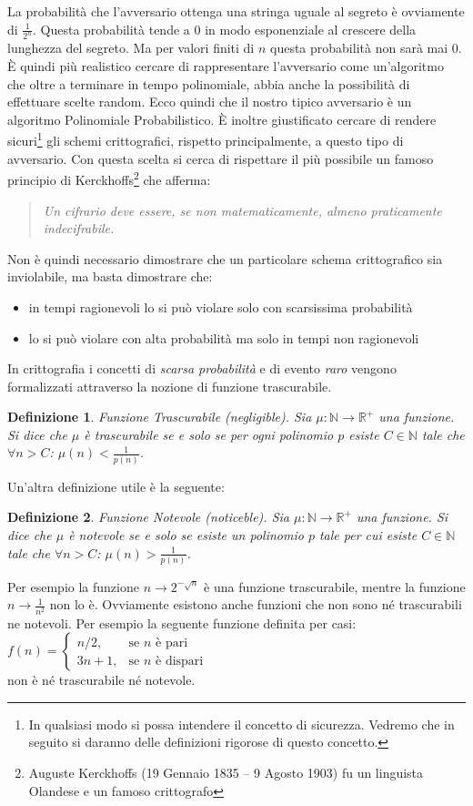 \documentclass[a4paper,openright,twoside,12pt]{report}
\newtheorem{definizione}{Definizione}[chapter]
\begin{document}
La probabilit\`a che l'avversario ottenga una stringa uguale al segreto \`e ovviamente di $\frac{1}{2^n}$. 
Questa probabilit\`a tende a 0 in modo esponenziale al crescere della lunghezza del segreto. Ma per valori finiti di $n$ questa probabilit\`a non sar\`a mai 0.
\`E quindi pi\`u realistico cercare di rappresentare l'avversario come un'algoritmo che oltre a terminare in tempo polinomiale, abbia
anche la possibilit\`a di effettuare scelte random.
Ecco quindi che il nostro tipico avversario \`e un algoritmo Polinomiale Probabilistico.
\`E inoltre giustificato cercare di rendere sicuri\footnote{In qualsiasi modo si possa intendere il concetto di sicurezza. 
Vedremo che in seguito si daranno delle definizioni rigorose di questo concetto.} gli schemi crittografici, rispetto principalmente, a questo tipo di avversario.
Con questa scelta si cerca di rispettare il pi\`u possibile un famoso principio di Kerckhoffs\footnote{Auguste Kerckhoffs (19 Gennaio 1835 – 9 Agosto 1903) 
fu un linguista Olandese e un famoso crittografo} che afferma: 
\begin{quotation}
\em
Un cifrario deve essere, se non matematicamente, almeno praticamente indecifrabile.
\end{quotation}
Non \`e quindi necessario dimostrare che un particolare schema crittografico sia inviolabile, ma basta dimostrare che:
\begin{itemize}
 \item in tempi ragionevoli lo si pu\`o violare solo con scarsissima probabilit\`a
 \item lo si pu\`o violare con alta probabilit\`a ma solo in tempi non ragionevoli
\end{itemize}
In crittografia i concetti di \emph{scarsa probabilit\`a} e di evento \emph{raro} vengono formalizzati attraverso la nozione di funzione trascurabile.
\begin{definizione}{Funzione Trascurabile (negligible).}
Sia $\mu: \mathbb{N} \rightarrow \mathbb{R^{+}}$ una funzione. Si dice che $\mu$ \`e trascurabile se e solo se per ogni polinomio $p$ esiste $C \in \mathbb{N} $ tale che $\forall n>C$: $\mu(n) < \frac{1}{p(n)}$.  
\end{definizione}
Un'altra definizione utile \`e la seguente:
\begin{definizione}{Funzione Notevole (noticeble).}
Sia $\mu: \mathbb{N} \rightarrow \mathbb{R^{+}}$ una funzione. Si dice che $\mu$ \`e notevole se e solo se esiste un polinomio $p$ tale per cui esiste $C \in \mathbb{N} $ tale che $\forall n>C$: $\mu(n) > \frac{1}{p(n)}$.  
\end{definizione}
Per esempio la funzione $n \rightarrow 2^{-\sqrt{n}}$ \`e una funzione trascurabile, mentre la funzione $n \rightarrow \frac{1}{n^2}$ non lo \`e. 
Ovviamente esistono anche funzioni che non sono n\'e trascurabili ne notevoli. Per esempio la seguente funzione definita per casi:
$f(n) = \begin{cases} n/2, & \mbox{se } n\mbox{ \`e pari} \\ 3n+1, & \mbox{se } n\mbox{ \`e dispari} \end{cases}$\\
non \`e n\'e trascurabile n\'e notevole.
\end{document}
